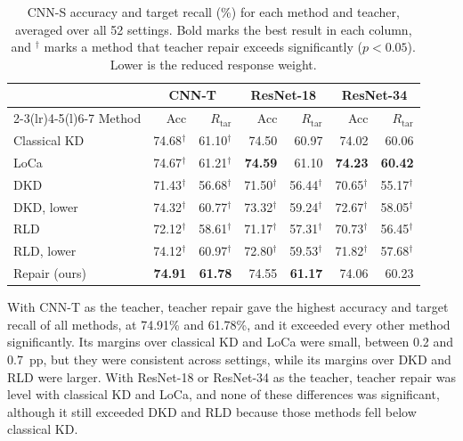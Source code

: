 \documentclass[review,number,sort&compress]{elsarticle}
\theoremstyle{definition}
\begin{document}
\begin{table}[htb]
\caption{CNN-S accuracy and target recall (\%) for each method and
teacher, averaged over all 52 settings. Bold marks the best result in
each column, and $^{\dagger}$ marks a method that teacher repair
exceeds significantly ($p<0.05$). Lower is the reduced response
weight.}
\label{tab:loss-results}
\centering
\footnotesize
\setlength{\tabcolsep}{2.5pt}
\renewcommand{\arraystretch}{1.1}
\begin{tabular}{@{}lrrrrrr@{}}
\toprule
& \multicolumn{2}{c}{CNN-T} & \multicolumn{2}{c}{ResNet-18} & \multicolumn{2}{c}{ResNet-34} \\
\cmidrule(lr){2-3}\cmidrule(lr){4-5}\cmidrule(l){6-7}
Method & Acc & $R_{\mathrm{tar}}$ & Acc & $R_{\mathrm{tar}}$ & Acc & $R_{\mathrm{tar}}$ \\
\midrule
Classical KD & 74.68$^{\dagger}$ & 61.10$^{\dagger}$ & 74.50 & 60.97 & 74.02 & 60.06 \\
LoCa & 74.67$^{\dagger}$ & 61.21$^{\dagger}$ & \textbf{74.59} & 61.10 & \textbf{74.23} & \textbf{60.42} \\
DKD & 71.43$^{\dagger}$ & 56.68$^{\dagger}$ & 71.50$^{\dagger}$ & 56.44$^{\dagger}$ & 70.65$^{\dagger}$ & 55.17$^{\dagger}$ \\
DKD, lower & 74.32$^{\dagger}$ & 60.77$^{\dagger}$ & 73.32$^{\dagger}$ & 59.24$^{\dagger}$ & 72.67$^{\dagger}$ & 58.05$^{\dagger}$ \\
RLD & 72.12$^{\dagger}$ & 58.61$^{\dagger}$ & 71.17$^{\dagger}$ & 57.31$^{\dagger}$ & 70.73$^{\dagger}$ & 56.45$^{\dagger}$ \\
RLD, lower & 74.12$^{\dagger}$ & 60.97$^{\dagger}$ & 72.80$^{\dagger}$ & 59.53$^{\dagger}$ & 71.82$^{\dagger}$ & 57.68$^{\dagger}$ \\
\midrule
Repair (ours) & \textbf{74.91} & \textbf{61.78} & 74.55 & \textbf{61.17} & 74.06 & 60.23 \\
\bottomrule
\end{tabular}
\end{table}

With CNN-T as the teacher, teacher repair gave the highest accuracy and
target recall of all methods, at 74.91\% and 61.78\%, and it exceeded
every other method significantly. Its margins over classical KD and
LoCa were small, between 0.2 and 0.7~pp, but they were consistent across
settings, while its margins over DKD and RLD were larger. With
ResNet-18 or ResNet-34 as the teacher, teacher repair was level with
classical KD and LoCa, and none of these differences was significant,
although it still exceeded DKD and RLD because those methods fell below
classical KD.
\end{document}
